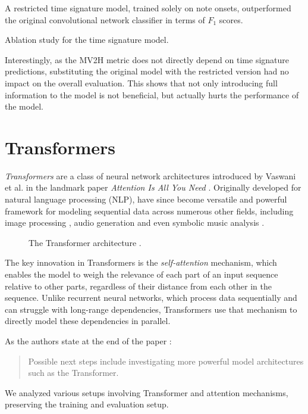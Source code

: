 A restricted time signature model, trained solely on note onsets, outperformed the original convolutional network classifier in terms of $F_1$ scores.

\begin{table}[ht!]
\centering

\caption[Ablation study for the time signature model.]{Ablation study for the time signature model.}
\label{time_signature_ablation}
\end{table}

Interestingly, as the MV2H metric does not directly depend on time signature predictions, substituting the original model with the restricted version had no impact on the overall evaluation. This shows that not only introducing full information to the model is not beneficial, but actually hurts the performance of the model. 

\section{Transformers}

\emph{Transformers} are a class of neural network architectures introduced by Vaswani et al. in the landmark paper \emph{Attention Is All You Need} \cite{Vaswani2017}. Originally developed for natural language processing (NLP), have since become versatile and powerful framework for modeling sequential data across numerous other fields, including image processing \cite{Dosovitskiy2020}, audio generation \cite{Borsos2023} and even symbolic music analysis \cite{Zhu2021}.

\begin{figure}[ht!]
\centering

\caption[The Transformer architecture.]{The Transformer architecture \cite{Vaswani2017}.}
\end{figure}

The key innovation in Transformers is the \emph{self-attention} mechanism, which enables the model to weigh the relevance of each part of an input sequence relative to other parts, regardless of their distance from each other in the sequence. Unlike recurrent neural networks, which process data sequentially and can struggle with long-range dependencies, Transformers use that mechanism to directly model these dependencies in parallel.

As the authors state at the end of the paper \cite{Liu2022}: \begin{quote}Possible next steps include investigating more powerful model architectures such as the Transformer.\end{quote} We analyzed various setups involving Transformer and attention mechanisms, preserving the training and evaluation setup.

